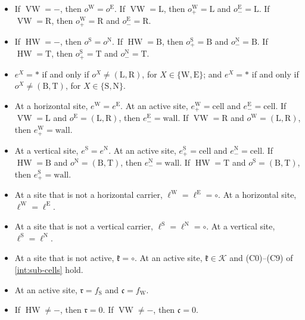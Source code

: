 \begin{itemize}
\item[(O1)] If $\operatorname{VW}=-$, then $o^{\mathrm W}=o^{\mathrm E}$. If $\operatorname{VW}=\mathrm L$, then $o^{\mathrm W}_+=\mathrm L$ and $o^{\mathrm E}_-=\mathrm L$. If $\operatorname{VW}=\mathrm R$, then $o^{\mathrm W}_+=\mathrm R$ and $o^{\mathrm E}_-=\mathrm R$.
\item[(O2)] If $\operatorname{HW}=-$, then $o^{\mathrm S}=o^{\mathrm N}$. If $\operatorname{HW}=\mathrm B$, then $o^{\mathrm S}_+=\mathrm B$ and $o^{\mathrm N}_-=\mathrm B$. If $\operatorname{HW}=\mathrm T$, then $o^{\mathrm S}_+=\mathrm T$ and $o^{\mathrm N}_-=\mathrm T$.
\item[(E1)] $e^X=*$ if and only if $o^X\ne(\mathrm L,\mathrm R)$, for $X\in\{\mathrm W,\mathrm E\}$; and $e^X=*$ if and only if $o^X\ne(\mathrm B,\mathrm T)$, for $X\in\{\mathrm S,\mathrm N\}$.
\item[(E2)] At a horizontal site, $e^{\mathrm W}=e^{\mathrm E}$. At an active site, $e^{\mathrm W}_+=\mathrm{cell}$ and $e^{\mathrm E}_-=\mathrm{cell}$. If $\operatorname{VW}=\mathrm L$ and $o^{\mathrm E}=(\mathrm L,\mathrm R)$, then $e^{\mathrm E}_-=\mathrm{wall}$. If $\operatorname{VW}=\mathrm R$ and $o^{\mathrm W}=(\mathrm L,\mathrm R)$, then $e^{\mathrm W}_+=\mathrm{wall}$.
\item[(E3)] At a vertical site, $e^{\mathrm S}=e^{\mathrm N}$. At an active site, $e^{\mathrm S}_+=\mathrm{cell}$ and $e^{\mathrm N}_-=\mathrm{cell}$. If $\operatorname{HW}=\mathrm B$ and $o^{\mathrm N}=(\mathrm B,\mathrm T)$, then $e^{\mathrm N}_-=\mathrm{wall}$. If $\operatorname{HW}=\mathrm T$ and $o^{\mathrm S}=(\mathrm B,\mathrm T)$, then $e^{\mathrm S}_+=\mathrm{wall}$.
\item[(K1)] At a site that is not a horizontal carrier, $\ell^{\mathrm W}=\ell^{\mathrm E}=\circ$. At a horizontal site, $\ell^{\mathrm W}=\ell^{\mathrm E}$.
\item[(K2)] At a site that is not a vertical carrier, $\ell^{\mathrm S}=\ell^{\mathrm N}=\circ$. At a vertical site, $\ell^{\mathrm S}=\ell^{\mathrm N}$.
\item[(K3)] At a site that is not active, $\mathfrak k=\circ$. At an active site, $\mathfrak k\in\mathcal K$ and (C0)--(C9) of \cref{int:sub-cells} hold.
\item[(Q1)] At an active site, $\mathfrak r=f_{\mathrm S}$ and $\mathfrak c=f_{\mathrm W}$.
\item[(Q2)] If $\operatorname{HW}\ne-$, then $\mathfrak r=0$. If $\operatorname{VW}\ne-$, then $\mathfrak c=0$.

\end{itemize}
